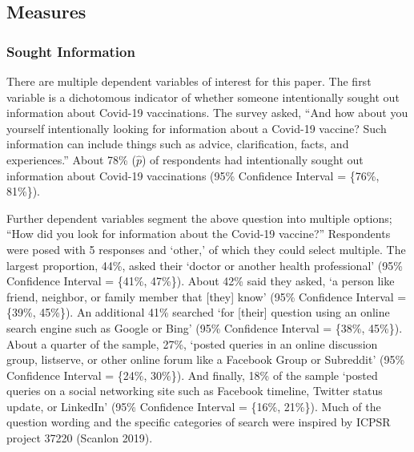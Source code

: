\hypertarget{measures}{%
\subsection{Measures}\label{measures}}

\hypertarget{sought-information}{%
\subsubsection{Sought Information}\label{sought-information}}

There are multiple dependent variables of interest for this paper. The first
variable is a dichotomous indicator of whether someone intentionally sought out
information about Covid-19 vaccinations. The survey asked, ``And how about you
yourself intentionally looking for information about a Covid-19 vaccine? Such
information can include things such as advice, clarification, facts, and
experiences.'' About 78\% (\(\widehat{p}\))
of respondents had intentionally sought out information about Covid-19
vaccinations (95\% Confidence Interval = \{76\%, 81\%\}).

Further dependent variables segment the above question into multiple options;
``How did you look for information about the Covid-19 vaccine?'' Respondents were
posed with 5 responses and `other,' of which they could select multiple. The
largest proportion, 44\%, asked their
`doctor or another health professional' (95\% Confidence Interval =
\{41\%, 47\%\}).
About 42\% said they asked, `a person
like friend, neighbor, or family member that {[}they{]} know' (95\% Confidence
Interval = \{39\%, 45\%\}). An additional
41\% searched `for {[}their{]} question
using an online search engine such as Google or Bing' (95\% Confidence Interval
= \{38\%, 45\%\}). About a quarter of the
sample, 27\%, `posted queries in an
online discussion group, listserve, or other online forum like a Facebook Group
or Subreddit' (95\% Confidence Interval = \{24\%, 30\%\}).
And finally, 18\% of the sample `posted queries
on a social networking site such as Facebook timeline, Twitter status update, or
LinkedIn' (95\% Confidence Interval = \{16\%, 21\%\}).
Much of the question wording and the specific categories of search were inspired
by ICPSR project 37220 (Scanlon 2019).

